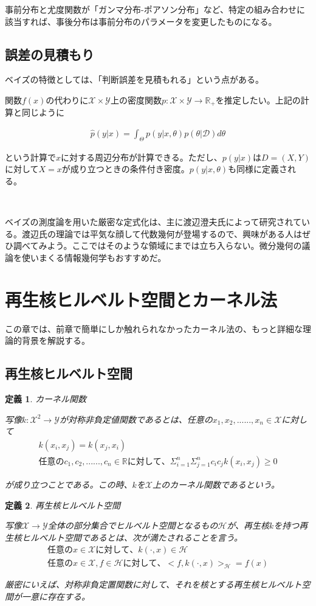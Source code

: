 \documentclass[dvipdfmx, a4paper]{jsarticle}
\newtheorem{defi}{定義}[section]
\begin{document}
事前分布と尤度関数が「ガンマ分布-ポアソン分布」など、特定の組み合わせに該当すれば、事後分布は事前分布のパラメータを変更したものになる。

\subsection{誤差の見積もり}

ベイズの特徴としては、「判断誤差を見積もれる」という点がある。

関数$f(x)$の代わりに$\mathcal{X}\times\mathcal{Y}$上の密度関数$p:\mathcal{X}\times\mathcal{Y}\to\mathbb{R}_+$を推定したい。上記の計算と同じように

\begin{align}
\hat{p}(y|x)=\int_\Theta p(y|x,\theta)p(\theta|\mathcal{D})d\theta
\end{align}

という計算で$x$に対する周辺分布が計算できる。ただし、$p(y|x)$は$D=(X,Y)$に対して$X=x$が成り立つときの条件付き密度。$p(y|x,\theta)$も同様に定義される。

　

ベイズの測度論を用いた厳密な定式化は、主に渡辺澄夫氏によって研究されている。渡辺氏の理論では平気な顔して代数幾何が登場するので、興味がある人はぜひ調べてみよう。ここではそのような領域にまでは立ち入らない。微分幾何の議論を使いまくる情報幾何学もおすすめだ。

\newpage
\section{再生核ヒルベルト空間とカーネル法}
この章では、前章で簡単にしか触れられなかったカーネル法の、もっと詳細な理論的背景を解説する。
\subsection{再生核ヒルベルト空間}
\begin{defi}カーネル関数

写像$k:\mathcal{X}^2\to\mathcal{Y}$が対称非負定値関数であるとは、任意の$x_1,x_2,......,x_n\in \mathcal{X}$に対して
\begin{align}
k(x_i,x_j)=k(x_j,x_i)\\
任意のc_1,c_2,......,c_n\in\mathbb{R}に対して、\Sigma^n_{i=1}\Sigma^n_{j=1}c_ic_jk(x_i,x_j)\geq0
\end{align}

が成り立つことである。この時、$k$を$\mathcal{X}$上のカーネル関数であるという。
\end{defi}
\begin{defi}再生核ヒルベルト空間

写像$\mathcal{X}\to\mathcal{Y}$全体の部分集合でヒルベルト空間となるもの$\mathcal{H}$が、再生核$k$を持つ再生核ヒルベルト空間であるとは、次が満たされることを言う。
\begin{align}
任意のx\in\mathcal{X}に対して、k(\cdot,x)\in\mathcal{H}\\
任意のx\in\mathcal{X},f\in\mathcal{H}に対して、<f,k(\cdot,x)>_\mathcal{H}=f(x)
\end{align}

厳密にいえば、対称非負定置関数に対して、それを核とする再生核ヒルベルト空間が一意に存在する。
\end{defi}
\end{document}
